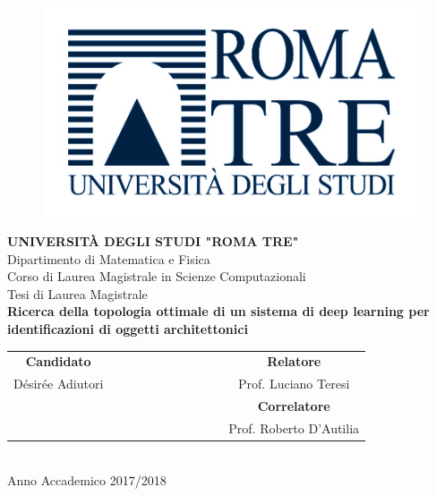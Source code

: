 \documentclass[a4paper,12pt,oneside]{book}
\begin{document}
\lstset{language=Python, showspaces=false, showstringspaces=false}
\thispagestyle{empty}
\begin{figure}
\centering
\includegraphics[scale=0.30]{Logo}
\end{figure}
\begin{center}
\textbf{UNIVERSIT\`{A} DEGLI STUDI "ROMA TRE"}\\
\textmd{\large Dipartimento di Matematica e Fisica}\\
\large{ Corso di Laurea Magistrale in Scienze Computazionali}\\	
\vspace{1.35cm}	
\textmd{\Large{Tesi di Laurea Magistrale}}\\
\vspace{1.5cm}
\LARGE{\LARGE{\textbf{Ricerca della topologia ottimale di un sistema di deep learning per identificazioni di oggetti architettonici}}}\\
\vspace{4.6cm}
\begin{tabular}{ccccccccccc}
	\large{\textbf{Candidato}}& & & & & & & & & & \large{\textbf{Relatore}}\\
	\large{D\'{e}sir\'{e}e Adiutori} & & & & & & & & & &\large{Prof. Luciano Teresi}\\
	& & & & & & & & & & \large{\textbf{Correlatore}}\\
	& & & & & & & & & & \large{Prof. Roberto D'Autilia}
\end{tabular}\\
\vspace{2.4cm}
\normalsize{Anno Accademico 2017/2018}
\end{center}
\newpage
\tableofcontents

\newpage
\end{document}

